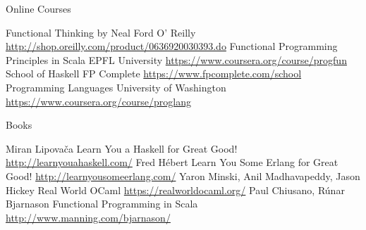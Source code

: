 \documentclass[mathserif]{beamer}
\begin{document}
\begin{frame}{Online Courses}

  \begin{thebibliography}{10}
      Functional Thinking by Neal Ford
      \newblock O' Reilly
      \newblock \url{http://shop.oreilly.com/product/0636920030393.do}
      Functional Programming Principles in Scala
      \newblock EPFL University
      \newblock \url{https://www.coursera.org/course/progfun}
      School of Haskell
      \newblock FP Complete
      \newblock \url{https://www.fpcomplete.com/school}
      Programming Languages
      \newblock University of Washington
      \newblock \url{https://www.coursera.org/course/proglang}
  \end{thebibliography}

\end{frame}

\begin{frame}{Books}

  \begin{thebibliography}{10}
      Miran Lipovača
      \newblock Learn You a Haskell for Great Good!
      \newblock \url{http://learnyouahaskell.com/}
      Fred Hébert
      \newblock Learn You Some Erlang for Great Good!
      \newblock \url{http://learnyousomeerlang.com/}
      Yaron Minski, Anil Madhavapeddy, Jason Hickey
      \newblock Real World OCaml
      \newblock \url{https://realworldocaml.org/}
      Paul Chiusano, Rúnar Bjarnason
      \newblock Functional Programming in Scala
      \newblock \url{http://www.manning.com/bjarnason/}
  \end{thebibliography}

\end{frame}
\end{document}
